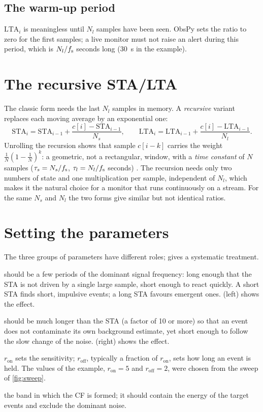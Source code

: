 \subsection{The warm-up period}
$\mathrm{LTA}_i$ is meaningless until $N_l$ samples have been seen. ObsPy sets the ratio to zero for the first samples; a
live monitor must not raise an alert during this period, which is $N_l/f_{\mathrm{s}}$ seconds long (30~s in the example).

\section{The recursive STA/LTA}
The classic form needs the last $N_l$ samples in memory. A \emph{recursive} variant replaces each moving average by an
exponential one:
\begin{equation}\label{eq:rec}
  \mathrm{STA}_i = \mathrm{STA}_{i-1} + \frac{c[i]-\mathrm{STA}_{i-1}}{N_s},\qquad
  \mathrm{LTA}_i = \mathrm{LTA}_{i-1} + \frac{c[i]-\mathrm{LTA}_{i-1}}{N_l}.
\end{equation}
Unrolling the recursion shows that sample $c[i-k]$ carries the weight $\frac1N(1-\frac1N)^k$: a geometric, not a
rectangular, window, with a \emph{time constant} of $N$ samples ($\tau_s=N_s/f_{\mathrm{s}}$, $\tau_l=N_l/f_{\mathrm{s}}$ seconds)
\parencite{withers1998,trnkoczy2012}. The recursion needs only two numbers of state and one multiplication per sample,
independent of $N_l$, which makes it the natural choice for a monitor that runs continuously on a stream.
For the same $N_s$ and $N_l$ the two forms give similar but not identical ratios.

\section{Setting the parameters}\label{sec:params}
The three groups of parameters have different roles; \textcite{trnkoczy2012} gives a systematic treatment.

\begin{description}[leftmargin=2.2cm,style=nextline]
\item[STA length] should be a few periods of the dominant signal frequency: long enough that the STA is not driven by a
  single large sample, short enough to react quickly. A short STA finds short, impulsive events; a long STA favours
  emergent ones.  (left) shows the effect.
\item[LTA length] should be much longer than the STA (a factor of 10 or more) so that an event does not contaminate its own
  background estimate, yet short enough to follow the slow change of the noise.  (right) shows the
  effect.
\item[Thresholds] $r_{\mathrm{on}}$ sets the sensitivity; $r_{\mathrm{off}}$, typically a fraction of $r_{\mathrm{on}}$, sets how
  long an event is held. The values of the example, $r_{\mathrm{on}}=5$ and $r_{\mathrm{off}}=2$, were chosen from the sweep of
  \cref{fig:sweep}.
\item[Pass band] the band in which the CF is formed; it should contain the energy of the target events and exclude
  the dominant noise.
\end{description}

